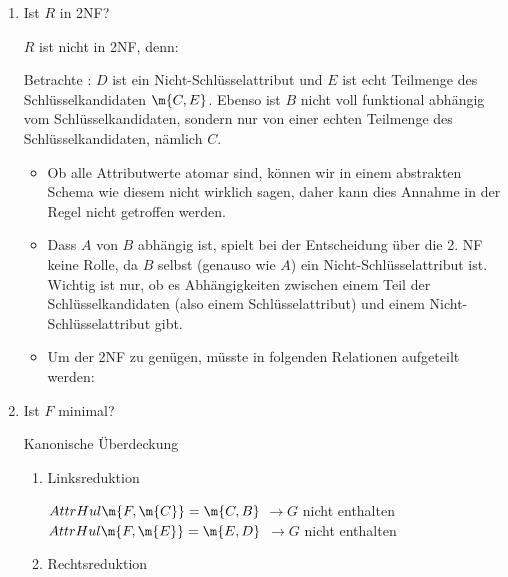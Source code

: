 \documentclass{bschlangaul-aufgabe}
\begin{document}
\begin{enumerate}
\item Ist $R$ in 2NF?

\begin{bAntwort}
$R$ ist nicht in 2NF, denn:

Betrachte : $D$ ist ein Nicht-Schlüsselattribut und $E$
ist echt Teilmenge des Schlüsselkandidaten $\m{C, E}$.
%
Ebenso ist $B$ nicht voll funktional abhängig vom Schlüsselkandidaten,
sondern nur von einer echten Teilmenge des Schlüsselkandidaten, nämlich
$C$.


\begin{itemize}
\item Ob alle Attributwerte atomar sind, können wir in einem abstrakten
Schema wie diesem nicht wirklich sagen, daher kann dies Annahme in der
Regel nicht getroffen werden.

\item Dass $A$ von $B$ abhängig ist, spielt bei der Entscheidung über
die 2. NF keine Rolle, da $B$ selbst (genauso wie $A$) ein
Nicht-Schlüsselattribut ist. Wichtig ist nur, ob es Abhängigkeiten
zwischen einem Teil der Schlüsselkandidaten (also einem
Schlüsselattribut) und einem Nicht-Schlüsselattribut gibt.

\item Um der 2NF zu genügen, müsste in folgenden Relationen aufgeteilt
werden:

\end{itemize}

\end{bAntwort}


\item Ist $F$ minimal?


\begin{bAntwort}
Kanonische Überdeckung

\begin{enumerate}
\item Linksreduktion

$AttrHul\m{F, \m{C}} = \m{C, B}$ $\rightarrow G$ nicht enthalten\\
$AttrHul\m{F, \m{E}} = \m{E, D}$ $\rightarrow G$ nicht enthalten

\item Rechtsreduktion


\end{enumerate}
\end{bAntwort}
\end{enumerate}
\end{document}

